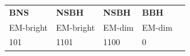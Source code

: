 \documentclass[binding=0.6cm, LaM]{sapthesis}
\begin{document}
\begin{table}[]
\begin{tabular}{|l|l|l|l|l|} \hline
\textbf{BNS}  & \textbf{NSBH}       & \textbf{NSBH}    & \textbf{BBH}     \\
EM-bright     & EM-bright  & EM-dim  & EM-dim  \\\hline
{\color{red}1}0{\color{green}1}  & {\color{red}1}1{\color{green}0}{\color{blue}1}  & {\color{red}1}1{\color{green}0}{\color{blue}0}  & {\color{red}0}  \\ \hline
\end{tabular}
\end{table}

		\begin{figure}[H]
		        \noindent
			\label{banktest}
                        \centering
                        \caption{}
                        \label{fig:banktest}
                \end{figure}

                \begin{figure}[H]
                        \noindent
                        \label{o3bankvso2bank}
                        \centering
                        \caption{}
                        \label{fig:o3bankvso2bank}
                \end{figure}
\end{document}
